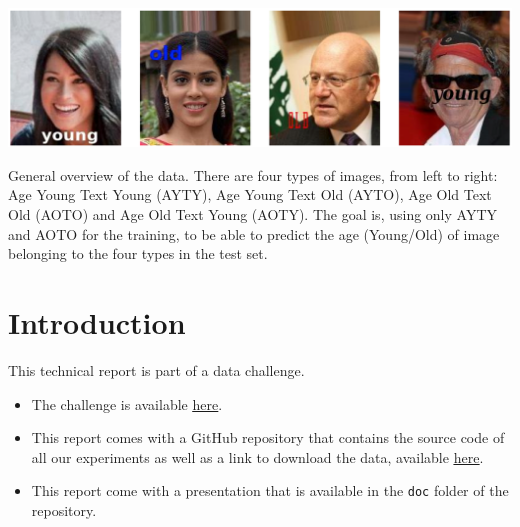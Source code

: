 \documentclass[sigconf, nonacm]{acmart}
\begin{document}
\begin{teaserfigure}
  \includegraphics[width=\textwidth]{teaser}
  \caption{General overview of the data. {\normalfont There are four types of images, from left to right: Age Young Text Young (AYTY), Age Young Text Old (AYTO), Age Old Text Old (AOTO) and Age Old Text Young (AOTY). The goal is, using only AYTY and AOTO for the training, to be able to predict the age (Young/Old) of image belonging to the four types in the test set.}}
  \label{fig:teaser}
\end{teaserfigure}


\maketitle

\section{Introduction}

This technical report is part of a data challenge.

\begin{itemize}
    \item The challenge is available \href{https://challengedata.ens.fr/participants/challenges/95/}{\underline{here}}.
    \item This report comes with a GitHub repository that contains the source code of all our experiments as well as a link to download the data, available \href{https://github.com/DentanJeremie/age-underspecification}{\underline{here}}.
    \item This report come with a presentation that is available in the \texttt{doc} folder of the repository.
\end{itemize}
\end{document}
